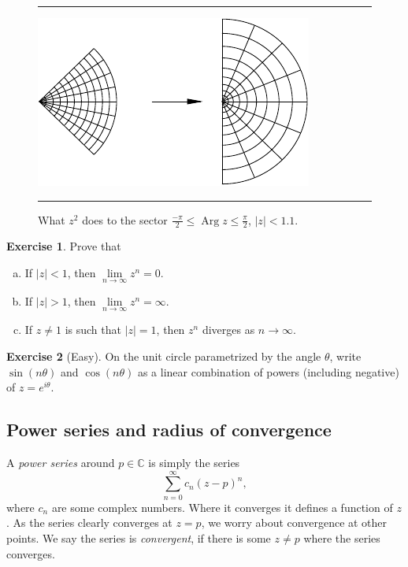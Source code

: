 \documentclass[12pt,openany]{book}
\newcommand{\sabs}[1]{\lvert {#1} \rvert}
\newcommand{\C}{{\mathbb{C}}}
\newcommand{\myindex}[1]{#1\index{#1}}
\theoremstyle{plain}
\theoremstyle{remark}
\theoremstyle{definition}
\newenvironment{exbox}{%
    \def\FrameCommand{\vrule width 1pt \relax\hspace{10pt}}%
    \MakeFramed{\advance\hsize-\width\FrameRestore}%
}{%
    \endMakeFramed
}
\newenvironment{exparts}{%
    \leavevmode\begin{enumerate}[a),noitemsep,topsep=0pt,parsep=0pt,partopsep=0pt]
}{%
    \end{enumerate}
}
\newenvironment{myfig}{%
\begin{figure}[h!t]
\noindent\rule{\textwidth}{0.5pt}\vspace{12pt}\par\centering}%
{\par\noindent\rule{\textwidth}{0.5pt}
\end{figure}}
\theoremstyle{exercise}
\newtheorem{exercise}{Exercise}[section]
\theoremstyle{example}
\begin{document}
\begin{myfig}
\includegraphics{figures/zsqplot}
\caption{What $z^2$ does to the sector
$\frac{-\pi}{2} \leq \operatorname{Arg} z \leq \frac{\pi}{2}$, $\sabs{z} <
1.1$.\label{fig:zsqplot}}
\end{myfig}

\begin{exbox}
\begin{exercise}
Prove that
\begin{exparts}
\item
If $\sabs{z}<1$, then $\lim\limits_{n\to \infty} z^n = 0$.
\item
If $\sabs{z}>1$, then $\lim\limits_{n\to \infty} z^n = \infty$.
\item
If $z \not= 1$ is such that $\sabs{z}=1$, then $z^n$ diverges as $n \to
\infty$.
\end{exparts}
\end{exercise}

\begin{exercise}[Easy]
On the unit circle parametrized by the angle $\theta$,
write $\sin(n\theta)$ and $\cos(n\theta)$ as a linear combination
of powers (including negative) of $z = e^{i\theta}$.
\end{exercise}
\end{exbox}

\subsection{Power series and radius of convergence}

A \emph{\myindex{power series}} around $p \in \C$ is simply the series
%
\begin{equation*}
\sum_{n=0}^\infty c_n {(z-p)}^n ,
\end{equation*}
where $c_n$ are some complex numbers.  Where it converges it defines a
function of $z$.  As the series clearly converges at $z=p$, we worry about
convergence at other points.  We say the series is
\emph{convergent}, if there is
some $z \not= p$ where the series converges.
\end{document}
